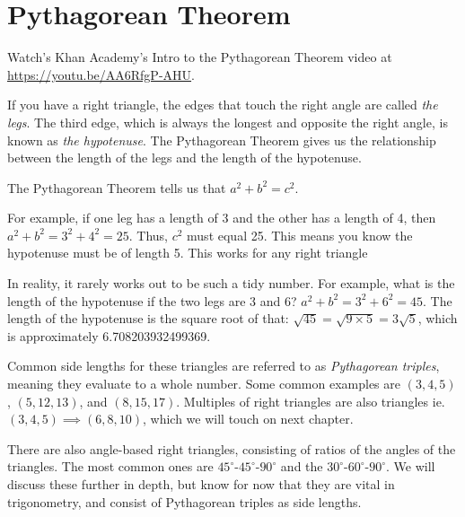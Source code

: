 \chapter{Pythagorean Theorem}

Watch's Khan Academy's Intro to the Pythagorean Theorem video at \url{https://youtu.be/AA6RfgP-AHU}.

If you have a right triangle, the edges that touch the right angle are
called \emph{the legs}.  The third edge, which is always the longest and opposite the right angle,
is known as \emph{the hypotenuse}. The Pythagorean Theorem gives us
the relationship between the length of the legs and the length of the
hypotenuse.


The Pythagorean Theorem tells us that $a^2 + b^2 = c^2$.

For example, if one leg has a length of 3 and the other has a length of 4, then
$a^2 + b^2 = 3^2 + 4^2 = 25$. Thus, $c^2$ must equal 25. This means you know
the hypotenuse must be of length 5. This works for any right triangle

In reality, it rarely works out to be such a tidy number. For
example, what is the length of the hypotenuse if the two legs are 3
and 6? $a^2 + b^2 = 3^2 + 6^2 = 45$.  The length of the hypotenuse is
the square root of that: $\sqrt{45} = \sqrt{9 \times 5} = 3 \sqrt{5}$,
which is approximately 6.708203932499369.

Common side lengths for these triangles are referred to as \emph{Pythagorean triples}, meaning they evaluate to a whole number. Some common examples are $(3, 4, 5)$, $(5, 12, 13)$, and $(8, 15, 17)$. Multiples of right triangles are also triangles ie. $(3, 4, 5) \implies (6, 8, 10)$, which we will touch on next chapter.

There are also angle-based right triangles, consisting of ratios of the angles of the triangles. The most common ones are $45^\circ$-$45^\circ$-$90^\circ$ and the $30^\circ$-$60^\circ$-$90^\circ$. We will discuss these further in depth, but know for now that they are vital in trigonometry, and consist of Pythagorean triples as side lengths. 

